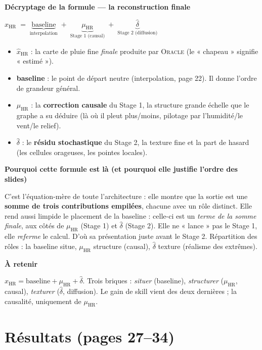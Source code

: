 \documentclass[11pt,a4paper]{article}
\newcommand{\Oracle}{\textsc{Oracle}}
\newcommand{\muHR}{\ensuremath{\mu_{\mathrm{HR}}}}
\newcommand{\HR}{\ensuremath{\text{HR}}}
\newcommand{\bloc}[1]{\par\medskip\noindent\textcolor{accent}{\textbf{#1}}\par\nopagebreak\smallskip}
\begin{document}
\bloc{Décryptage de la formule --- la reconstruction finale}
\begin{formulebox}
\centering $\widehat{x}_{\HR} \;=\; \underbrace{\text{baseline}}_{\text{interpolation}} \;+\; \underbrace{\muHR}_{\text{Stage 1 (causal)}} \;+\; \underbrace{\widehat{\delta}}_{\text{Stage 2 (diffusion)}}$
\end{formulebox}
\begin{itemize}[nosep]
  \item $\widehat{x}_{\HR}$ : la carte de pluie fine \emph{finale} produite par \Oracle{} (le « chapeau » signifie « estimé »).
  \item \textbf{baseline} : le point de départ neutre (interpolation, page 22). Il donne l'ordre de grandeur général.
  \item \muHR{} : la \textbf{correction causale} du Stage 1, la structure grande échelle que le graphe a su déduire (là où il pleut plus/moins, pilotage par l'humidité/le vent/le relief).
  \item $\widehat{\delta}$ : le \textbf{résidu stochastique} du Stage 2, la texture fine et la part de hasard (les cellules orageuses, les pointes locales).
\end{itemize}

\bloc{Pourquoi cette formule est là (et pourquoi elle justifie l'ordre des slides)}
C'est l'équation-mère de toute l'architecture : elle montre que la sortie est une \textbf{somme de trois contributions empilées}, chacune avec un rôle distinct. Elle rend aussi limpide le placement de la baseline : celle-ci est un \emph{terme de la somme finale}, aux côtés de \muHR{} (Stage 1) et $\widehat{\delta}$ (Stage 2). Elle ne « lance » pas le Stage 1, elle \emph{referme} le calcul. D'où sa présentation juste avant le Stage 2. Répartition des rôles : la baseline situe, \muHR{} structure (causal), $\widehat{\delta}$ texture (réalisme des extrêmes).

\bloc{À retenir}
$\widehat{x}_{\HR} = \text{baseline} + \muHR + \widehat{\delta}$. Trois briques : \emph{situer} (baseline), \emph{structurer} (\muHR{}, causal), \emph{texturer} ($\widehat{\delta}$, diffusion). Le gain de skill vient des deux dernières ; la causalité, uniquement de \muHR{}.

\section{Résultats (pages 27--34)}
\end{document}
